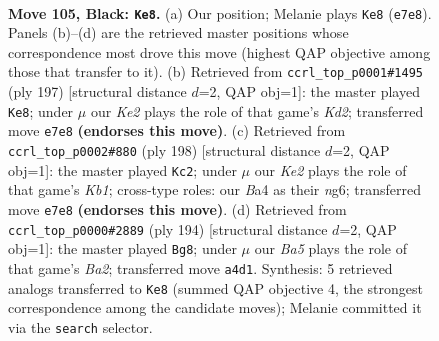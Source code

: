 \documentclass[11pt]{article}
\begin{document}
\clearpage

\begin{figure}[p]\centering
\begin{subfigure}{0.46\textwidth}\centering
\resizebox{\linewidth}{!}{%
\newchessgame
\chessboard[
  setfen={6K1/4k3/8/5p2/b4P2/8/8/8 b - - 25 105},
  showmover=false,
  pgfstyle=straightmove, color=movearrow, markmove={e7-e8}
]}
\caption{}
\end{subfigure}\hfill
\begin{subfigure}{0.46\textwidth}\centering
\resizebox{\linewidth}{!}{%
\newchessgame
\chessboard[
  setfen={8/3k4/8/4p3/8/5P2/B2K4/6b1 b - - 20 99},
  showmover=false,
  pgfstyle=straightmove, color=movearrow, markmove={d7-e8}
]}
\caption{}
\end{subfigure}
\\[4pt]
\begin{subfigure}{0.46\textwidth}\centering
\resizebox{\linewidth}{!}{%
\newchessgame
\chessboard[
  setfen={8/3B4/3p2n1/3P4/1k6/8/8/1K6 w - - 13 100},
  showmover=false,
  pgfstyle=straightmove, color=movearrow, markmove={b1-c2}
]}
\caption{}
\end{subfigure}\hfill
\begin{subfigure}{0.46\textwidth}\centering
\resizebox{\linewidth}{!}{%
\newchessgame
\chessboard[
  setfen={8/4b3/1p6/1P6/8/6K1/B7/6k1 w - - 9 98},
  showmover=false,
  pgfstyle=straightmove, color=movearrow, markmove={a2-g8}
]}
\caption{}
\end{subfigure}
\caption{\textbf{Move 105, Black: \texttt{Ke8}.} (a) Our position; Melanie plays \texttt{Ke8} (\texttt{e7e8}). Panels (b)--(d) are the retrieved master positions whose correspondence most drove this move (highest QAP objective among those that transfer to it). (b) Retrieved from \texttt{ccrl\_top\_p0001\#1495} (ply 197) [structural distance $d$=2, QAP obj=1]: the master played \texttt{Ke8}; under $\mu$ our \emph{Ke2} plays the role of that game's \emph{Kd2}; transferred move \texttt{e7e8} \textbf{(endorses this move)}. (c) Retrieved from \texttt{ccrl\_top\_p0002\#880} (ply 198) [structural distance $d$=2, QAP obj=1]: the master played \texttt{Kc2}; under $\mu$ our \emph{Ke2} plays the role of that game's \emph{Kb1}; cross-type roles: our \emph{B}a4 as their \emph{n}g6; transferred move \texttt{e7e8} \textbf{(endorses this move)}. (d) Retrieved from \texttt{ccrl\_top\_p0000\#2889} (ply 194) [structural distance $d$=2, QAP obj=1]: the master played \texttt{Bg8}; under $\mu$ our \emph{Ba5} plays the role of that game's \emph{Ba2}; transferred move \texttt{a4d1}. Synthesis: 5 retrieved analogs transferred to \texttt{Ke8} (summed QAP objective 4, the strongest correspondence among the candidate moves); Melanie committed it via the \texttt{search} selector.}
\label{fig:thought-m209}
\end{figure}
\end{document}
